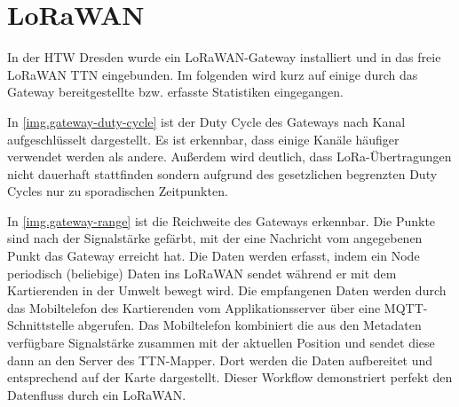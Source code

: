 \section{LoRaWAN}
In der HTW Dresden wurde ein LoRaWAN-Gateway installiert und in das freie LoRaWAN \gls{TTN} eingebunden.
Im folgenden wird kurz auf einige durch das Gateway bereitgestellte bzw. erfasste Statistiken eingegangen.

In \autoref{img.gateway-duty-cycle} ist der Duty Cycle des Gateways nach Kanal aufgeschlüsselt dargestellt.
Es ist erkennbar, dass einige Kanäle häufiger verwendet werden als andere.
Außerdem wird deutlich, dass LoRa-Übertragungen nicht dauerhaft stattfinden sondern aufgrund des gesetzlichen begrenzten Duty Cycles nur zu sporadischen Zeitpunkten.

In \autoref{img.gateway-range} ist die Reichweite des Gateways erkennbar.
Die Punkte sind nach der Signalstärke gefärbt, mit der eine Nachricht vom angegebenen Punkt das Gateway erreicht hat.
Die Daten werden erfasst, indem ein Node periodisch (beliebige) Daten ins LoRaWAN sendet während er mit dem Kartierenden in der Umwelt bewegt wird.
Die empfangenen Daten werden durch das Mobiltelefon des Kartierenden vom Applikationsserver über eine MQTT-Schnittstelle abgerufen.
Das Mobiltelefon kombiniert die aus den Metadaten verfügbare Signalstärke zusammen mit der aktuellen Position und sendet diese dann an den Server des TTN-Mapper.
Dort werden die Daten aufbereitet und entsprechend auf der Karte dargestellt.
Dieser Workflow demonstriert perfekt den Datenfluss durch ein LoRaWAN.

